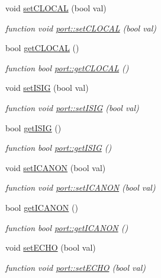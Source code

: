 \begin{DoxyCompactItemize}
void \hyperlink{classport_a4a9d4fc5915b00350438f5e7319fb23e}{set\+C\+L\+O\+C\+AL} (bool val)
\begin{DoxyCompactList}\small\item\em function void \hyperlink{classport_a4a9d4fc5915b00350438f5e7319fb23e}{port\+::set\+C\+L\+O\+C\+AL} (bool val) \end{DoxyCompactList}\item 
bool \hyperlink{classport_a623de59915a0b9dd51ed6045828c4a1c}{get\+C\+L\+O\+C\+AL} ()
\begin{DoxyCompactList}\small\item\em function bool \hyperlink{classport_a623de59915a0b9dd51ed6045828c4a1c}{port\+::get\+C\+L\+O\+C\+AL} () \end{DoxyCompactList}\item 
void \hyperlink{classport_a5e1a90cfde8ddb3240e0f6f12e0ebe80}{set\+I\+S\+IG} (bool val)
\begin{DoxyCompactList}\small\item\em function void \hyperlink{classport_a5e1a90cfde8ddb3240e0f6f12e0ebe80}{port\+::set\+I\+S\+IG} (bool val) \end{DoxyCompactList}\item 
bool \hyperlink{classport_a4d394ecfaebb015a16a93ebca7afea22}{get\+I\+S\+IG} ()
\begin{DoxyCompactList}\small\item\em function bool \hyperlink{classport_a4d394ecfaebb015a16a93ebca7afea22}{port\+::get\+I\+S\+IG} () \end{DoxyCompactList}\item 
void \hyperlink{classport_a2975fb4424cccd46e2da267bd53e3ad0}{set\+I\+C\+A\+N\+ON} (bool val)
\begin{DoxyCompactList}\small\item\em function void \hyperlink{classport_a2975fb4424cccd46e2da267bd53e3ad0}{port\+::set\+I\+C\+A\+N\+ON} (bool val) \end{DoxyCompactList}\item 
bool \hyperlink{classport_a50945a4a78dd74a71004878d38c7cc97}{get\+I\+C\+A\+N\+ON} ()
\begin{DoxyCompactList}\small\item\em function bool \hyperlink{classport_a50945a4a78dd74a71004878d38c7cc97}{port\+::get\+I\+C\+A\+N\+ON} () \end{DoxyCompactList}\item 
void \hyperlink{classport_ab00aa47d139c536a84ca0b2ec9f8ef96}{set\+E\+C\+HO} (bool val)
\begin{DoxyCompactList}\small\item\em function void \hyperlink{classport_ab00aa47d139c536a84ca0b2ec9f8ef96}{port\+::set\+E\+C\+HO} (bool val) \end{DoxyCompactList}\item 

\end{DoxyCompactItemize}
